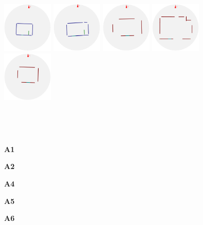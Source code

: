\documentclass[review]{vgtc}                 %
\begin{document}
\begin{figure}[t]
\begin{minipage}[b]{4.9in}
  \includegraphics[width=0.95in]{images/section2/3_2D_walls_rotate} %
  \includegraphics[width=0.95in]{images/section2/5_2D_walls_rotate} %
  \includegraphics[width=0.95in]{images/section2/9_2D_walls_rotate} %
  \includegraphics[width=0.95in]{images/section2/10_2D_walls_rotate} %
  \includegraphics[width=0.95in]{images/section2/11_2D_walls_rotate} %
\end{minipage}
\vspace{-1.12in}
\\
\begin{minipage}{1.92in}~\end{minipage}
\begin{minipage}{0.95in}{\bf A1}\end{minipage}
\begin{minipage}{0.95in}{\bf A2}\end{minipage}
\begin{minipage}{0.95in}{\bf A4}\end{minipage}
\begin{minipage}{0.95in}{\bf A5}\end{minipage}
\begin{minipage}{0.95in}{\bf A6}\end{minipage}

\end{figure}
\end{document}
